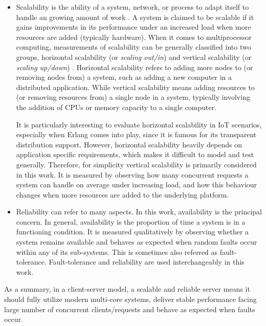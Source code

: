 \begin{itemize}

\item Scalability is the ability of a system, network, or process to adapt itself to handle an growing amount of work \autocite{Bondi:2000:CSI:350391.350432}. A system is claimed to be scalable if it gains improvements in its performance under an increased load when more resources are added (typically hardware). When it comes to multiprocessor computing, measurements of scalability can be generally classified into two groups, horizontal scalability (or \textit{scaling out/in}) and vertical scalability (or \textit{scaling up/down}) \autocite{4228359}. Horizontal scalability refers to adding more nodes to (or removing nodes from) a system, such as adding a new computer in a distributed application. While vertical scalability means adding resources to (or removing resources from) a single node in a system, typically involving the addition of CPUs or memory capacity to a single computer. 


It is particularly interesting to evaluate horizontal scalability in IoT scenarios, especially when Erlang comes into play, since it is famous for its transparent distribution support. However, horizontal scalability heavily depends on application specific requirements, which makes it difficult to model and test generally. Therefore, for simplicity vertical scalability is primarily considered in this work. It is measured by observing how many concurrent requests a system can handle on average under increasing load, and how this behaviour changes when more resources are added to the underlying platform. 

\item Reliability can refer to many aspects. In this work, availability is the principal concern. In general, availability is the proportion of time a system is in a functioning condition. It is measured qualitatively by observing whether a system remains available and behaves as expected when random faults occur within any of its sub-systems. This is sometimes also referred as fault-tolerance. Fault-tolerance and reliability are used interchangeably in this work.

\end{itemize}



As a summary, in a client-server model, a scalable and reliable server means it should fully utilize modern multi-core systems, deliver stable performance facing large number of concurrent clients/requests and behave as expected when faults occur.



